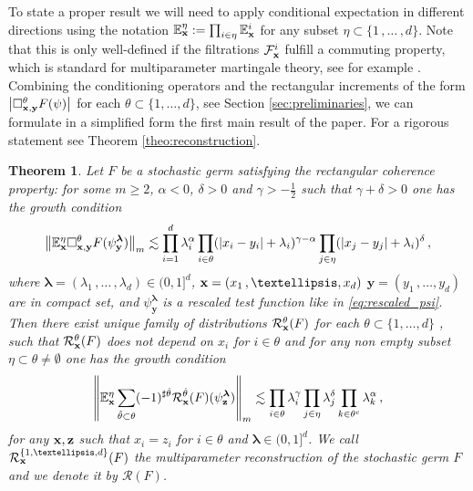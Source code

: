 \documentclass[12pt]{article}
\numberwithin{equation}{section}
\theoremstyle{plain}
\newtheorem{theorem}{Theorem}[section]
\theoremstyle{definition}
\newcommand{\abs}[1]{\left\vert #1 \right\vert}
\newcommand{\norm}[1]{\left\Vert #1\right\Vert}
\def\bE{\mathbb{E}}\def\bW{\mathbb{W}}
\def\fy{\mathbf y}\def\fz{\mathbf z}
\def\flambda{{\boldsymbol\lambda}}
\begin{document}
To state a proper result we will need to apply conditional expectation in different directions using the notation $\bE^\eta_\fx := \prod_{i\in\eta} \bE^i_\fx$ for any subset $\eta \subset\{1\,,\ldots \,, d\}$. Note that this is only well-defined if the filtrations $\mathcal{F}^i_\mathbf x$ fulfill a commuting property, which is standard for multiparameter martingale theory, see for example \cite[Section 3.4]{Khoshnevisan02}. Combining the conditioning operators and the rectangular increments of the form 
$\abs{\square^\theta_{\fx,\fy} F(\psi)}$ for each $\theta\subset\{1,\dots,d\}$, see Section \ref{sec:preliminaries}, we can formulate in a simplified form the first main result of the paper. For a rigorous statement see Theorem \ref{theo:reconstruction}.
\begin{theorem}\label{thm:rec_form}
Let $F$ be a stochastic germ satisfying the rectangular coherence property:  for some $m\ge 2$, $\alpha<0$, $\delta>0$ and $\gamma>-\frac 12$ such that $\gamma+\delta > 0$ one has the growth condition
  \[ 
  \norm{\bE^\eta_\fx \square^\theta_{\fx,\fy} F(\psi_\fy^{\flambda})}_m \lesssim \prod_{i=1}^d\lambda_i^{\alpha}\prod_{i\in \theta}(|x_i-y_i|+\lambda_i)^{\gamma-\alpha}\prod_{j\in \eta}(|x_j-y_j|+\lambda_i)^{\delta}\,,
  \]
 where $\flambda=(\lambda_1\,, \ldots\,, \lambda_d)\in (0,1]^d$, $\fx= (x_1\,, \ldots ,x_d)$ $\fy= (y_1\,, \ldots ,y_d)$ are in compact set, and  $\psi_\fy^{\flambda} $ is a rescaled test function like in  \eqref{eq:rescaled_psi}. Then there exist unique family of distributions $\mathcal{R}^\theta_\mathbf x (F)$ for each $\theta\subset\{1,\dots,d\}$ , such that $\mathcal{R} _\mathbf x^\theta(F)$ does not depend on $x_i$ for $i\in\theta$ and for any non empty subset $\eta\subset\theta\neq\emptyset$ one has the growth condition 
\begin{equation}\label{eq:reconstruction,estimate}
\norm{\bE^\eta_\fx\sum_{\hat\theta \subset\theta}(-1)^{\sharp\hat\theta} \mathcal{R} ^{\hat\theta}_\fx(F)(\psi^\flambda_\fz)}_m \lesssim \prod_{i\in \theta}\lambda_i^{\gamma}\prod_{j\in\eta} \lambda_j^\delta\prod_{k\in \theta^c}\lambda_k^{\alpha}\,,
 \end{equation}
 for any $\fx,\fz$ such that $x_i=z_i$ for $i\in\theta$ and $\flambda\in(0,1]^d$. We call $\mathcal{R}^{\{1, \ldots , d\}}_{\fx}(F)$ the multiparameter  reconstruction of the stochastic germ $F$ and we denote it by $\mathcal{R} (F)$.
\end{theorem}
\end{document}
